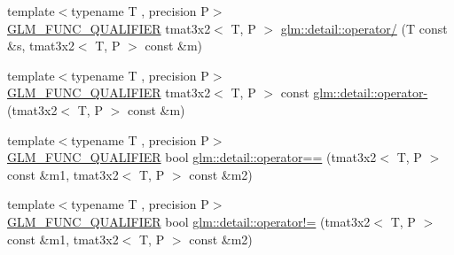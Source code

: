 \begin{DoxyCompactItemize}
\item 
{\footnotesize template$<$typename T , precision P$>$ }\\\hyperlink{setup_8hpp_a33fdea6f91c5f834105f7415e2a64407}{G\+L\+M\+\_\+\+F\+U\+N\+C\+\_\+\+Q\+U\+A\+L\+I\+F\+I\+ER} tmat3x2$<$ T, P $>$ \hyperlink{namespaceglm_1_1detail_a34645b896679fcdec4567e0e4931c136}{glm\+::detail\+::operator/} (T const \&s, tmat3x2$<$ T, P $>$ const \&m)
\item 
{\footnotesize template$<$typename T , precision P$>$ }\\\hyperlink{setup_8hpp_a33fdea6f91c5f834105f7415e2a64407}{G\+L\+M\+\_\+\+F\+U\+N\+C\+\_\+\+Q\+U\+A\+L\+I\+F\+I\+ER} tmat3x2$<$ T, P $>$ const \hyperlink{namespaceglm_1_1detail_ac249b5c50db93af1f119379ce25240ee}{glm\+::detail\+::operator-\/} (tmat3x2$<$ T, P $>$ const \&m)
\item 
{\footnotesize template$<$typename T , precision P$>$ }\\\hyperlink{setup_8hpp_a33fdea6f91c5f834105f7415e2a64407}{G\+L\+M\+\_\+\+F\+U\+N\+C\+\_\+\+Q\+U\+A\+L\+I\+F\+I\+ER} bool \hyperlink{namespaceglm_1_1detail_a261a29a648fd29f49715c01b96a61009}{glm\+::detail\+::operator==} (tmat3x2$<$ T, P $>$ const \&m1, tmat3x2$<$ T, P $>$ const \&m2)
\item 
{\footnotesize template$<$typename T , precision P$>$ }\\\hyperlink{setup_8hpp_a33fdea6f91c5f834105f7415e2a64407}{G\+L\+M\+\_\+\+F\+U\+N\+C\+\_\+\+Q\+U\+A\+L\+I\+F\+I\+ER} bool \hyperlink{namespaceglm_1_1detail_a4090f47a460c0dc3d90f8041212ac052}{glm\+::detail\+::operator!=} (tmat3x2$<$ T, P $>$ const \&m1, tmat3x2$<$ T, P $>$ const \&m2)
\end{DoxyCompactItemize}

